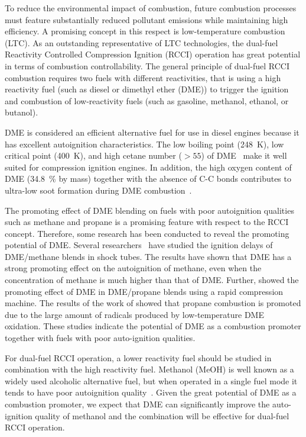 \documentclass[12pt]{ussci}
\begin{document}
To reduce the environmental impact of combustion, future combustion processes
must feature substantially reduced pollutant emissions while maintaining high
efficiency. A promising concept in this respect is low-temperature combustion
(LTC). As an outstanding representative of LTC technologies, the dual-fuel
Reactivity Controlled Compression Ignition (RCCI) operation has great potential
in terms of combustion controllability. The general principle of dual-fuel RCCI
combustion requires two fuels with different reactivities, that is using a high
reactivity fuel (such as diesel or dimethyl ether (DME)) to trigger the ignition
and combustion of low-reactivity fuels (such as gasoline, methanol, ethanol, or
butanol).

DME is considered an efficient alternative fuel for use in diesel engines
because it has excellent autoignition characteristics. The low boiling point
(\SI{248}{\K}), low critical point (\SI{400}{\K}), and high cetane number (\(>
55\)) of DME~\autocite{Arcoumanis2008,Teng2001} make it well suited for
compression ignition engines. In addition, the high oxygen content of DME
(\SI{34.8}{\percent} by mass) together with the absence of C-C bonds
contributes to ultra-low soot formation during DME
combustion~\autocite{Arcoumanis2008}.

The promoting effect of DME blending on fuels with poor autoignition qualities
such as methane and propane is a promising feature with respect to the RCCI
concept. Therefore, some research has been conducted to reveal the promoting
potential of DME. Several researchers~\autocite{Burke2015a,Tang2012a,Chen2007a}
have studied the ignition delays of DME/methane blends in shock tubes. The
results have shown that DME has a strong promoting effect on the autoignition of
methane, even when the concentration of methane is much higher than that of DME.
Further, \textcite{Dames2016} showed the promoting effect of DME in DME/propane
blends using a rapid compression machine. The results of the work of
\textcite{Dames2016} showed that propane combustion is promoted due to the large
amount of radicals produced by low-temperature DME oxidation. These studies
indicate the potential of DME as a combustion promoter together with fuels with
poor auto-ignition qualities.

For dual-fuel RCCI operation, a lower reactivity fuel should be studied in
combination with the high reactivity fuel. Methanol (MeOH) is well known as a
widely used alcoholic alternative fuel, but when operated in a single fuel mode
it tends to have poor autoignition quality~\autocite{Siebers1987}. Given the
great potential of DME as a combustion promoter, we expect that DME can
significantly improve the auto-ignition quality of methanol and the combination
will be effective for dual-fuel RCCI operation.
\end{document}
